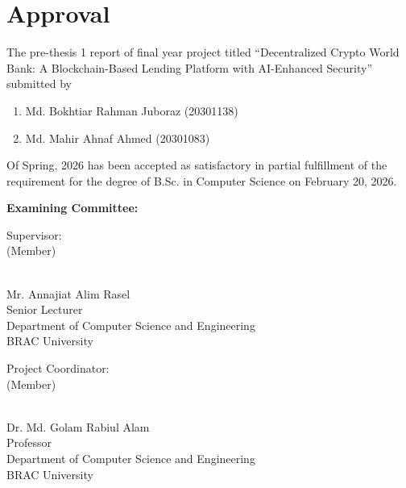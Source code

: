 \documentclass[12pt, a4paper]{report}
\begin{document}
\chapter*{Approval}
{}

The pre-thesis 1 report of final year project titled ``Decentralized Crypto World Bank: A Blockchain-Based Lending Platform with AI-Enhanced Security'' submitted by

\begin{enumerate}
\item Md. Bokhtiar Rahman Juboraz (20301138)
\item Md. Mahir Ahnaf Ahmed (20301083)
\end{enumerate}

Of Spring, 2026 has been accepted as satisfactory in partial fulfillment of the requirement for the degree of B.Sc. in Computer Science on February 20, 2026.

\vspace{1cm}

\textbf{Examining Committee:}

\vspace{1.5cm}

\begin{flushleft}
Supervisor:\\
(Member)
\end{flushleft}

\begin{flushright}
\vspace{-0.5cm}
\hrulefill\\
Mr. Annajiat Alim Rasel\\
Senior Lecturer\\
Department of Computer Science and Engineering\\
BRAC University
\end{flushright}

\vspace{1.5cm}

\begin{flushleft}
Project Coordinator:\\
(Member)
\end{flushleft}

\begin{flushright}
\vspace{-0.5cm}
\hrulefill\\
Dr. Md. Golam Rabiul Alam\\
Professor\\
Department of Computer Science and Engineering\\
BRAC University
\end{flushright}
\end{document}
